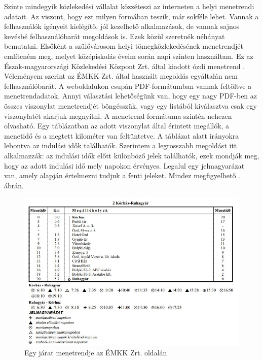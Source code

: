 


Szinte mindegyik közlekedési vállalat közzéteszi az interneten a helyi menetrendi adatait. Az viszont, hogy ezt milyen formában teszik, már sokféle lehet. Vannak a felhasználók igényeit kielégítő, jól kezelhető alkalmazások, de vannak sajnos kevésbé felhasználóbarát megoldások is. Ezek közül szeretnék néhányat bemutatni.
Elsőként a szülővárosom helyi tömegközlekedésének menetrendjét említeném meg, melyet középiskolás éveim során napi szinten használtam. Ez az Észak-magyarországi Közlekedési Központ Zrt. által kiadott ózdi menetrend \cite{emkk}. Véleményem szerint az ÉMKK Zrt. által használt megoldás egyáltalán nem felhasználóbarát. A weboldalukon csupán PDF-formátumban vannak feltöltve a menetrendadatok. Annyi választási lehetőségünk van, hogy egy nagy PDF-ben az összes viszonylat menetrendjét böngésszük, vagy egy listából kiválasztva csak egy viszonylatét akarjuk megnyitni. A menetrend formátuma szintén nehezen olvasható. Egy táblázatban az adott viszonylat által érintett megállók, a menetidő és a megtett kilométer van feltüntetve. A táblázat alatt irányokra lebontva az indulási idők találhatók. Szerintem a legrosszabb megoldást itt alkalmazzák: az indulási idők előtt különböző jelek találhatók, ezek mondják meg, hogy az adott indulási idő mely napokon érvényes. Legalul egy jelmagyarázat van, amely alapján értelmezni tudjuk a fenti jeleket. Mindez megfigyelhető . ábrán.

\begin{figure}[h!]
\centering
\includegraphics[scale=0.7]{kepek/EMKK_menetrend.jpg}
\caption{Egy járat menetrendje az ÉMKK Zrt. oldalán}
\label{fig:EMKK_menetrend}
\end{figure}

